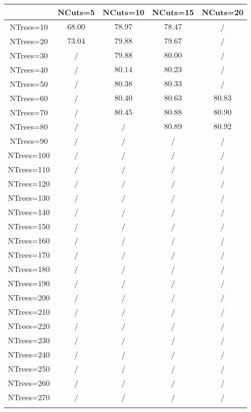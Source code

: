 \centering
\begin{tabular}{ccccc} \toprule\toprule
 & NCuts=5 & NCuts=10 & NCuts=15 & NCuts=20\\\midrule
NTrees=10 & $68.00$ & $78.97$ & $78.47$ &  /\\
NTrees=20 & $73.04$ & $79.88$ & $79.67$ &  /\\
NTrees=30 &  / & $79.88$ & $80.00$ &  /\\
NTrees=40 &  / & $80.14$ & $80.23$ &  /\\
NTrees=50 &  / & $80.38$ & $80.33$ &  /\\
NTrees=60 &  / & $80.40$ & $80.63$ & $80.83$\\
NTrees=70 &  / & $80.45$ & $80.88$ & $80.90$\\
NTrees=80 &  / &  / & $80.89$ & $80.92$\\
NTrees=90 &  / &  / &  / &  /\\
NTrees=100 &  / &  / &  / &  /\\
NTrees=110 &  / &  / &  / &  /\\
NTrees=120 &  / &  / &  / &  /\\
NTrees=130 &  / &  / &  / &  /\\
NTrees=140 &  / &  / &  / &  /\\
NTrees=150 &  / &  / &  / &  /\\
NTrees=160 &  / &  / &  / &  /\\
NTrees=170 &  / &  / &  / &  /\\
NTrees=180 &  / &  / &  / &  /\\
NTrees=190 &  / &  / &  / &  /\\
NTrees=200 &  / &  / &  / &  /\\
NTrees=210 &  / &  / &  / &  /\\
NTrees=220 &  / &  / &  / &  /\\
NTrees=230 &  / &  / &  / &  /\\
NTrees=240 &  / &  / &  / &  /\\
NTrees=250 &  / &  / &  / &  /\\
NTrees=260 &  / &  / &  / &  /\\
NTrees=270 &  / &  / &  / &  /\\
\bottomrule\bottomrule\\
\end{tabular}

